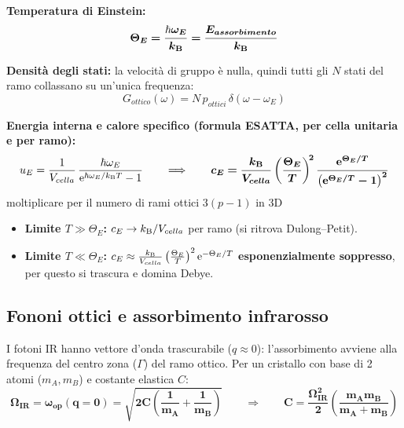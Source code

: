 \noindent\textbf{Temperatura di Einstein:}
\[ \bm{\Theta_E = \frac{\hbar\omega_E}{k_{\mathrm{B}}} = \frac{E_{assorbimento}}{k_{\mathrm{B}}}} \]

\noindent\textbf{Densità degli stati:} la velocità di gruppo è nulla, quindi tutti gli $N$ stati del ramo collassano su un'unica frequenza:
\[ G_{ottico}(\omega) = N\,p_{ottici}\,\delta(\omega-\omega_E) \]

\noindent\textbf{Energia interna e calore specifico (formula ESATTA, per cella unitaria e per ramo):}
\[ u_E = \frac{1}{V_{cella}}\,\frac{\hbar\omega_E}{\mathrm{e}^{\hbar\omega_E/k_{\mathrm{B}} T}-1}
   \qquad\Longrightarrow\qquad
   \bm{c_E = \frac{k_{\mathrm{B}}}{V_{cella}}\left(\frac{\Theta_E}{T}\right)^{\!2}
        \frac{\mathrm{e}^{\Theta_E/T}}{\left(\mathrm{e}^{\Theta_E/T}-1\right)^{2}}} \]
moltiplicare per il numero di rami ottici $3(p-1)$ in 3D
\begin{itemize}
  \item \textbf{Limite $T\gg\Theta_E$:} $c_E \to k_{\mathrm{B}}/V_{cella}$ per ramo (si ritrova Dulong--Petit).
  \item \textbf{Limite $T\ll\Theta_E$:} $c_E \approx \frac{k_{\mathrm{B}}}{V_{cella}}\left(\frac{\Theta_E}{T}\right)^2\mathrm{e}^{-\Theta_E/T}$ \textbf{esponenzialmente soppresso}, per questo si trascura e domina Debye.
\end{itemize}



\subsection{Fononi ottici e assorbimento infrarosso}
I fotoni IR hanno vettore d'onda trascurabile ($q\approx0$): l'assorbimento avviene alla frequenza del centro zona ($\Gamma$) del ramo ottico. Per un cristallo con base di 2 atomi ($m_A, m_B$) e costante elastica $C$:
\[ \bm{\Omega_{IR} = \omega_{op}(q=0) = \sqrt{2C\left(\frac{1}{m_A}+\frac{1}{m_B}\right)}}
   \qquad\Longrightarrow\qquad
   \bm{C = \frac{\Omega_{IR}^2}{2}\left(\frac{m_A m_B}{m_A+m_B}\right)} \]

